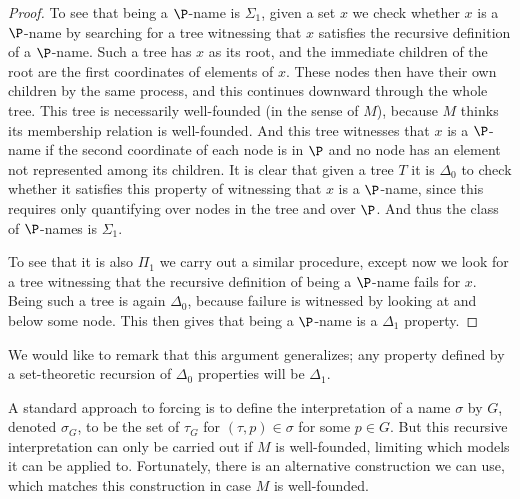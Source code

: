 \documentclass{amsart}
\begin{document}
 \begin{proof}
 To see that being a $\P$-name is $\Sigma_1$, given a set $x$ we check whether $x$ is a $\P$-name by searching for a tree witnessing that $x$ satisfies the recursive definition of a $\P$-name. Such a tree has $x$ as its root, and the immediate children of the root are the first coordinates of elements of $x$. These nodes then have their own children by the same process, and this continues downward through the whole tree. This tree is necessarily well-founded (in the sense of $M$), because $M$ thinks its membership relation is well-founded. And this tree witnesses that $x$ is a $\P$-name if the second coordinate of each node is in $\P$ and no node has an element not represented among its children. It is clear that given a tree $T$ it is $\Delta_0$ to check whether it satisfies this property of witnessing that $x$ is a $\P$-name, since this requires only quantifying over nodes in the tree and over $\P$. And thus the class of $\P$-names is $\Sigma_1$.
 
 To see that it is also $\Pi_1$ we carry out a similar procedure, except now we look for a tree witnessing that the recursive definition of being a $\P$-name fails for $x$. Being such a tree is again $\Delta_0$, because failure is witnessed by looking at and below some node. This then gives that being a $\P$-name is a $\Delta_1$ property.
 \end{proof}
 
 We would like to remark that this argument generalizes; any property defined by a set-theoretic recursion of $\Delta_0$ properties will be $\Delta_1$.
 \smallskip
 
 A standard approach to forcing is to define the interpretation of a name $\sigma$ by $G$, denoted $\sigma_G$, to be the set of $\tau_G$ for $(\tau,p) \in \sigma$ for some $p \in G$. But this recursive interpretation can only be carried out if $M$ is well-founded, limiting which models it can be applied to. Fortunately, there is an alternative construction we can use, which matches this construction in case $M$ is well-founded.
 
\end{document}
